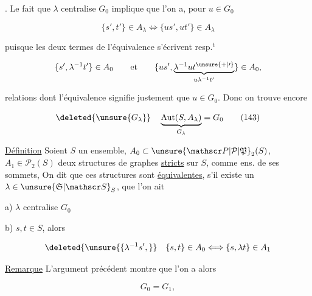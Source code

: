 
. Le fait que $\lambda$ centralise $G_0$ implique que l'on a, pour $u\in G_0$

\[
 \{s',t'\}\in A_\lambda\Longleftrightarrow\{us',ut'\}\in A_\lambda
 \tag*{(142)}
\]

puisque les deux termes de l'équivalence s'écrivent resp.$^{\mathrm t}$

\[
 \{s',\lambda^{-1}t'\}\in A_0\qquad\text{et}\qquad
 \{us',\underbrace{\lambda^{-1}ut^{\unsure{+|\prime}}}_{u\lambda^{-1}t'}\}\in A_0,
\]

relations dont l'équivalence signifie justement que $u\in G_0$. Donc on trouve encore

\[
 \deleted{\unsure{G_\lambda}}\quad\underbrace{\operatorname{Aut}(S,A_\lambda)}_{G_\lambda}=G_0
 \tag*{(143)}
\]

\uline{Définition} Soient $S$ un ensemble, $A_0\subset\unsure{\mathscr P|\mathcal P|\mathfrak P}_2(S)$, $A_1\in\mathscr P_2(S)$ deux structures de graphes \uline{stricts}  sur $S$,  comme ens. de ses sommets,  On dit que ces structures sont \uline{équivalentes}, s'il existe un $\lambda\in\unsure{\mathfrak S|\mathscr S}_S$,  que  l'on ait

a) $\lambda$ centralise $G_0$

b)   $s,t\in S$, alors

\[
 \deleted{\unsure{\{\lambda^{-1}s',}}\quad
 \{s,t\}\in A_0\Longleftrightarrow\{s,\lambda t\}\in A_1
\]



\uline{Remarque} L'argument précédent montre que l'on a alors

\[
 G_0=G_1,
\]


